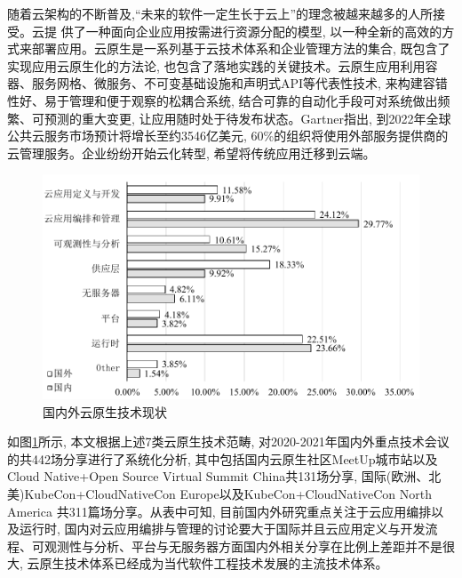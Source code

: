 随着云架构的不断普及,“未来的软件一定生长于云上”的理念被越来越多的人所接受。云提
供了一种面向企业应用按需进行资源分配的模型, 以一种全新的高效的方式来部署应用。云原生是一系列基于云技术体系和企业管理方法的集合, 既包含了实现应用云原生化的方法论, 也包含了落地实践的关键技术。云原生应用利用容器、服务网格、微服务、不可变基础设施和声明式API等代表性技术, 来构建容错性好、易于管理和便于观察的松耦合系统, 结合可靠的自动化手段可对系统做出频繁、可预测的重大变更, 让应用随时处于待发布状态。Gartner指出, 到2022年全球公共云服务市场预计将增长至约3546亿美元, 60\%的组织将使用外部服务提供商的云管理服务\cite{bhagavan2020achieving}。企业纷纷开始云化转型, 希望将传统应用迁移到云端。

\begin{figure}[h] %
    \centering %
    \includegraphics[width=0.9 \textwidth]{FIGs/chapter2/workshop.pdf} %
    \caption{国内外云原生技术现状} %
    \label{workshop} %
\end{figure}%

如图\ref{workshop}所示, 本文根据上述7类云原生技术范畴, 对2020-2021年国内外重点技术会议的共442场分享进行了系统化分析, 其中包括国内云原生社区MeetUp城市站以及Cloud Native+Open Source Virtual Summit China共131场分享, 国际(欧洲、北美)KubeCon+CloudNativeCon Europe以及KubeCon+CloudNativeCon North America 共311篇场分享。从表中可知, 目前国内外研究重点关注于云应用编排以及运行时, 国内对云应用编排与管理的讨论要大于国际并且云应用定义与开发流程、可观测性与分析、平台与无服务器方面国内外相关分享在比例上差距并不是很大, 云原生技术体系已经成为当代软件工程技术发展的主流技术体系。

